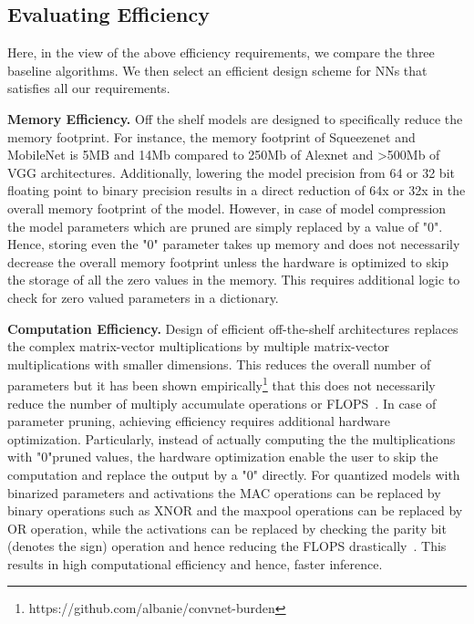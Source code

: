 \subsection{Evaluating Efficiency}
\label{eval-efficiency}

Here, in the view of the above efficiency requirements, we compare the three baseline algorithms.
We then select an efficient design scheme for NNs that satisfies all our requirements.


\noindent\textbf{Memory Efficiency.} Off the shelf models are designed to specifically reduce the memory footprint.
For instance, the memory footprint of Squeezenet and MobileNet is 5MB and 14Mb compared to 250Mb of Alexnet and >500Mb of VGG architectures.
Additionally, lowering the model precision from 64 or 32 bit floating point to binary precision results in a direct reduction of 64x or 32x in the overall memory footprint of the model.
However, in case of model compression the model parameters which are pruned are simply replaced by a value of "0".
Hence, storing even the "0" parameter takes up memory and does not necessarily decrease the overall memory footprint unless the hardware is optimized to skip the storage of all the zero values in the memory.
This requires additional logic to check for zero valued parameters in a dictionary.




\noindent\textbf{Computation Efficiency.} Design of efficient off-the-shelf architectures replaces the complex matrix-vector multiplications by multiple matrix-vector multiplications with smaller dimensions.
This reduces the overall number of parameters but it has been shown empirically\footnote{https://github.com/albanie/convnet-burden} that this does not necessarily reduce the number of multiply accumulate operations or FLOPS~\cite{article}.
In case of parameter pruning, achieving efficiency requires additional hardware optimization. Particularly, instead of actually computing the the multiplications with "0"pruned values, the hardware optimization enable the user to skip the computation and replace the output by a "0" directly.
For quantized models with binarized parameters and activations the MAC operations can be replaced by binary operations such as XNOR and the maxpool operations can be replaced by OR operation, while the activations can be replaced by checking the parity bit (denotes the sign) operation and hence reducing the FLOPS drastically~\cite{235489}.
This results in high computational efficiency and hence, faster inference.


